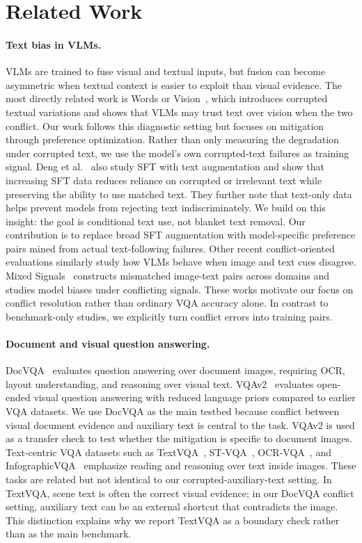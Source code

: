 \section{Related Work}

\paragraph{Text bias in VLMs.}
VLMs are trained to fuse visual and textual inputs, but fusion can become asymmetric when textual context is easier to exploit than visual evidence.
The most directly related work is Words or Vision~\cite{deng2025words}, which introduces corrupted textual variations and shows that VLMs may trust text over vision when the two conflict.
Our work follows this diagnostic setting but focuses on mitigation through preference optimization.
Rather than only measuring the degradation under corrupted text, we use the model's own corrupted-text failures as training signal.
Deng et al.~\cite{deng2025words} also study SFT with text augmentation and show that increasing SFT data reduces reliance on corrupted or irrelevant text while preserving the ability to use matched text.
They further note that text-only data helps prevent models from rejecting text indiscriminately.
We build on this insight: the goal is conditional text use, not blanket text removal.
Our contribution is to replace broad SFT augmentation with model-specific preference pairs mined from actual text-following failures.
Other recent conflict-oriented evaluations similarly study how VLMs behave when image and text cues disagree.
Mixed Signals~\cite{kim2025mixedsignals} constructs mismatched image-text pairs across domains and studies model biases under conflicting signals.
These works motivate our focus on conflict resolution rather than ordinary VQA accuracy alone.
In contrast to benchmark-only studies, we explicitly turn conflict errors into training pairs.

\paragraph{Document and visual question answering.}
DocVQA~\cite{mathew2021docvqa} evaluates question answering over document images, requiring OCR, layout understanding, and reasoning over visual text.
VQAv2~\cite{goyal2017vqav2} evaluates open-ended visual question answering with reduced language priors compared to earlier VQA datasets.
We use DocVQA as the main testbed because conflict between visual document evidence and auxiliary text is central to the task.
VQAv2 is used as a transfer check to test whether the mitigation is specific to document images.
Text-centric VQA datasets such as TextVQA~\cite{singh2019textvqa}, ST-VQA~\cite{biten2019stvqa}, OCR-VQA~\cite{mishra2019ocrvqa}, and InfographicVQA~\cite{mathew2022infographicvqa} emphasize reading and reasoning over text inside images.
These tasks are related but not identical to our corrupted-auxiliary-text setting.
In TextVQA, scene text is often the correct visual evidence; in our DocVQA conflict setting, auxiliary text can be an external shortcut that contradicts the image.
This distinction explains why we report TextVQA as a boundary check rather than as the main benchmark.

